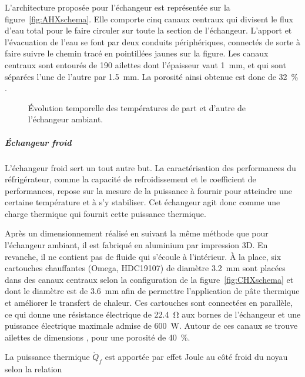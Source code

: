 L'architecture proposée pour l'échangeur est représentée sur la figure~\ref{fig:AHXschema}. Elle comporte cinq canaux centraux qui divisent le flux d'eau total pour le faire circuler sur toute la section de l'échangeur. L'apport et l'évacuation de l'eau se font par deux conduits périphériques, connectés de sorte à faire suivre le chemin tracé en pointillées jaunes sur la figure. Les canaux centraux sont entourés de \num{190} ailettes dont l'épaisseur vaut \qty{1}{\milli\meter}, et qui sont séparées l'une de l'autre par \qty{1.5}{\milli\metre}. La porosité ainsi obtenue est donc de \qty{32}{\percent} .

\begin{figure}[!ht]
	\centering
	
	\caption{\'Evolution temporelle des températures de part et d'autre de l'échangeur ambiant.  }
	\label{fig:TemperatureAHX_InOut}
\end{figure}

\subparagraph{\'Echangeur froid}
L'échangeur froid sert un tout autre but. La caractérisation des performances du réfrigérateur, comme la capacité de refroidissement et le coefficient de performances, repose sur la mesure de la puissance à fournir pour atteindre une certaine température et à s'y stabiliser. Cet échangeur agit donc comme une charge thermique  qui fournit cette puissance thermique.

Après un dimensionnement réalisé en suivant la même méthode que pour l'échangeur ambiant, il est fabriqué en aluminium par impression 3D. En revanche, il ne contient pas de fluide qui s'écoule à l'intérieur. À la place, six cartouches chauffantes (Omega, HDC19107) de diamètre \qty{3.2}{\milli\meter} sont placées dans des canaux centraux selon la configuration de la figure~\ref{fig:CHXschema} et dont le diamètre est de \qty{3.6}{\milli\meter} afin de permettre l'application de pâte thermique et améliorer le transfert de chaleur. Ces cartouches sont connectées en parallèle, ce qui donne une résistance électrique de \qty{22.4}{\ohm} aux bornes de l'échangeur et une puissance électrique maximale admise de \qty{600}{\watt}. Autour de ces canaux se trouve  ailettes de dimensions , pour une porosité de \qty{40}{\percent}.

La puissance thermique $\dot Q_f$ est apportée par effet Joule au côté froid du noyau selon la relation

